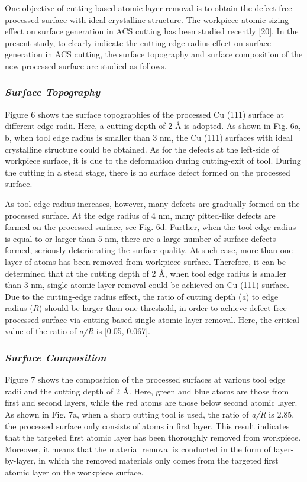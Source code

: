 \documentclass{article}
\begin{document}
One objective of cutting-based atomic layer removal is to obtain the defect-free processed surface with ideal crystalline structure. The workpiece atomic sizing effect on surface generation in ACS cutting has been studied recently [20]. In the present study, to clearly indicate the cutting-edge radius effect on surface generation in ACS cutting, the surface topography and surface composition of the new processed surface are studied as follows.

\subsubsection*{\emph{Surface Topography}}

Figure 6 shows the surface topographies of the processed Cu (111) surface at different edge radii. Here, a cutting depth of 2 Å is adopted. As shown in Fig. 6a, b, when tool edge radius is smaller than 3 nm, the Cu (111) surfaces with ideal crystalline structure could be obtained. As for the defects at the left-side of workpiece surface, it is due to the deformation during cutting-exit of tool. During the cutting in a stead stage, there is no surface defect formed on the processed surface.

As tool edge radius increases, however, many defects are gradually formed on the processed surface. At the edge radius of 4 nm, many pitted-like defects are formed on the processed surface, see Fig. 6d. Further, when the tool edge radius is equal to or larger than 5 nm, there are a large number of surface defects formed, seriously deteriorating the surface quality. At such case, more than one layer of atoms has been removed from workpiece surface. Therefore, it can be determined that at the cutting depth of 2 Å, when tool edge radius is smaller than 3 nm, single atomic layer removal could be achieved on Cu (111) surface. Due to the cutting-edge radius effect, the ratio of cutting depth (\emph{a}) to edge radius (\emph{R}) should be larger than one threshold, in order to achieve defect-free processed surface via cutting-based single atomic layer removal. Here, the critical value of the ratio of \emph{a/R} is [0.05, 0.067].

\subsubsection*{\emph{Surface Composition}}

Figure 7 shows the composition of the processed surfaces at various tool edge radii and the cutting depth of 2 Å. Here, green and blue atoms are those from first and second layers, while the red atoms are those below second atomic layer. As shown in Fig. 7a, when a sharp cutting tool is used, the ratio of \emph{a/R} is 2.85, the processed surface only consists of atoms in first layer. This result indicates that the targeted first atomic layer has been thoroughly removed from workpiece. Moreover, it means that the material removal is conducted in the form of layer-by-layer, in which the removed materials only comes from the targeted first atomic layer on the workpiece surface.
\end{document}
